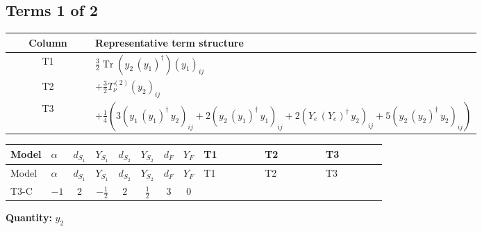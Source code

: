 \documentclass[8pt]{article}
\begin{document}
\begin{landscape}
\subsection*{Terms 1 of 2}
\begin{center}
\begin{tabular}{@{}c >{\raggedright\arraybackslash}p{0.82\linewidth}@{}}
\toprule
Column & Representative term structure \\
\midrule
T1 & \(\displaystyle \frac{3}{2} \operatorname{Tr}\!\left({y_2}\,\left({y_1}\right)^{\dagger}\right) \left({y_1}\right)_{ij}\) \\
\midrule
T2 & \(\displaystyle +\frac{3}{2} T_{\nu}^{(2)} \left({y_2}\right)_{ij}\) \\
\midrule
T3 & \(\displaystyle +\frac{1}{4} (3 \left({y_1}\,\left({y_1}\right)^{\dagger}\,{y_2}\right)_{ij}+2 \left({y_2}\,\left({y_1}\right)^{\dagger}\,{y_1}\right)_{ij}+2 \left({Y_e}\,\left({Y_e}\right)^{\dagger}\,{y_2}\right)_{ij}+5 \left({y_2}\,\left({y_2}\right)^{\dagger}\,{y_2}\right)_{ij})\) \\
\midrule
\bottomrule
\end{tabular}
\end{center}
\smallskip
\tiny
\begin{longtable}{@{}llcccccc >{\raggedright\arraybackslash}p{0.21\linewidth} >{\raggedright\arraybackslash}p{0.21\linewidth} >{\raggedright\arraybackslash}p{0.21\linewidth}@{}}
\toprule
Model & $\alpha$ & $d_{S_1}$ & $Y_{S_1}$ & $d_{S_2}$ & $Y_{S_2}$ & $d_F$ & $Y_F$ & T1 & T2 & T3 \\
\midrule
\endfirsthead
\toprule
Model & $\alpha$ & $d_{S_1}$ & $Y_{S_1}$ & $d_{S_2}$ & $Y_{S_2}$ & $d_F$ & $Y_F$ & T1 & T2 & T3 \\
\midrule
\endhead
T3-C & $-1$ & $2$ & $-\frac{1}{2}$ & $2$ & $\frac{1}{2}$ & $3$ & $0$ & \scriptsize\adjustbox{max width=\linewidth}{$\begin{gathered} \frac{3}{2} \operatorname{Tr}\!\left({y_2}\,\left({y_1}\right)^{\dagger}\right) \left({y_1}\right)_{ij}\end{gathered}$} & \scriptsize\adjustbox{max width=\linewidth}{$\begin{gathered} +\frac{3}{2} T_{\nu}^{(2)} \left({y_2}\right)_{ij}\end{gathered}$} & \scriptsize\adjustbox{max width=\linewidth}{$\begin{gathered} +\frac{1}{4} (3 \left({y_1}\,\left({y_1}\right)^{\dagger}\,{y_2}\right)_{ij}+2 \left({y_2}\,\left({y_1}\right)^{\dagger}\,{y_1}\right)_{ij}+2 \left({Y_e}\,\left({Y_e}\right)^{\dagger}\,{y_2}\right)_{ij}+5 \left({y_2}\,\left({y_2}\right)^{\dagger}\,{y_2}\right)_{ij})\end{gathered}$} \\
\midrule
\bottomrule
\end{longtable}
\clearpage
\noindent\textbf{Quantity: }$y_2$\par\smallskip

\end{landscape}
\end{document}
